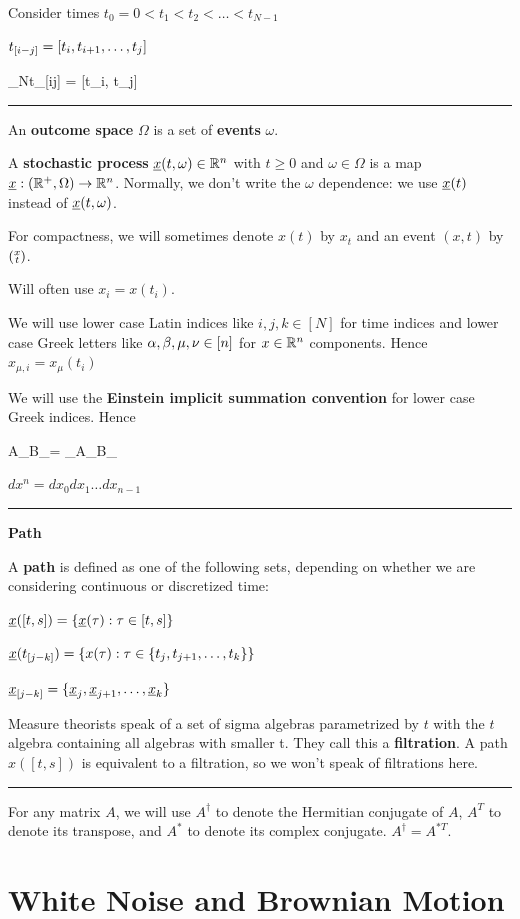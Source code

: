 Consider times $t_0=0<t_1<t_2<\ldots < t_{N-1}$



$t_{[i- j]} = [t_i, t_{i+1}, \ldots, t_j]$


\beq
\lim_{N\rarrow \infty}t_{[i\upto j]} =
[t_i, t_j]
\eeq
\hrule{}

An {\bf outcome space} $\Omega$ 
is a set of {\bf events} $\omega$.

A {\bf stochastic process} ${\underline{x}}(t, \omega)\in{ \mathbb{R}}^n$ with $t\geq 0$ and $\omega\in\Omega$ is a map ${\underline{x}}:({ \mathbb{R}}^+,\Omega) \rightarrow { \mathbb{R}}^n$. Normally, we don't write the $\omega$ dependence: we use ${\underline{x}}(t)$ instead of ${\underline{x}}(t, \omega)$.

For compactness, we will sometimes denote $x(t)$ by $x_t$ and an event $(x,t)$ by  $({\substack{x\\t}})$. 

Will often use $x_i=x(t_i)$.

We will use lower case Latin indices like $i,j,k\in [N]$ for time indices
and lower case Greek letters like $\alpha, \beta, \mu, \nu\in[n]$  for $x\in{ \mathbb{R}}^n$ components.
Hence $x_{\mu, i}=x_\mu(t_i)$

We will use the {\bf Einstein implicit summation
convention} for lower case Greek indices.
Hence

\beq
A_\mu B_\mu = \sum_{\mu \in[n]}A_\mu B_\mu
\eeq


$dx^n = dx_0 dx_1 \ldots dx_{n-1}$
\hrule\noindent
{\bf Path}

A {\bf path} is defined as one of the following sets, depending on whether we are considering continuous or discretized time:

${\underline{x}}([t,s])=\{  {\underline{x}}(\tau): \tau\in[t,s]\}$


${\underline{x}}(t_{[j- k]}) =\{  x(\tau): \tau\in\{t_j, t_{j+1}, \ldots, t_k\}\}$

${\underline{x}}_{[j- k]} =\{ {\underline{x}}_j, {\underline{x}}_{j+1},
\ldots,{\underline{x}}_k\}$

Measure theorists speak of a set of sigma algebras 
parametrized by $t$
with the $t$ algebra
containing
all algebras with smaller t.
 They call this a {\bf filtration}. A path $x([t, s])$ is equivalent to a filtration,
so we won't speak of filtrations here.
\hrule
For any matrix $A$,
we will use $A^\dagger$ to denote the Hermitian conjugate of $A$, $A^T$ to denote its transpose, and $A^*$ to denote its complex conjugate. $A^\dagger = A^{* T}$.

 
 \section{White Noise and Brownian Motion}
 
